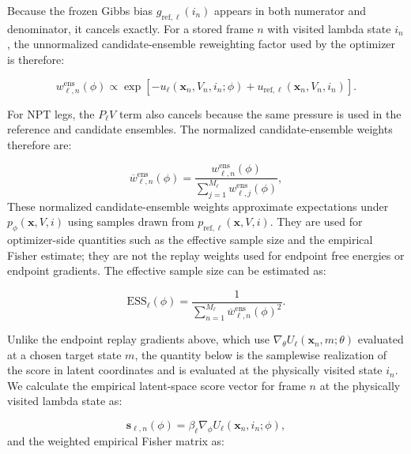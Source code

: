 Because the frozen Gibbs bias $g_{\mathrm{ref},\ell}(i_n)$ appears in both numerator and denominator, it cancels exactly. For a stored frame $n$ with visited lambda state $i_n$, the unnormalized candidate-ensemble reweighting factor used by the optimizer is therefore:

\begin{equation}
    w^{\mathrm{ens}}_{\ell,n}(\phi)
    \propto
    \exp \left[
        -
        u_\ell(\mathbf{x}_n, V_n, i_n; \phi)
        +
        u_{\mathrm{ref},\ell}(\mathbf{x}_n, V_n, i_n)
    \right].
    \label{eq:wactive}
\end{equation}

For NPT legs, the $P_\ell V$ term also cancels because the same pressure is used in the reference and candidate ensembles. The normalized candidate-ensemble weights therefore are:

\begin{equation}
    \overline{w}^{\mathrm{ens}}_{\ell,n}(\phi)
    =
    \frac{
        w^{\mathrm{ens}}_{\ell,n}(\phi)
    }{
        \sum_{j=1}^{M_\ell} w^{\mathrm{ens}}_{\ell,j}(\phi)
    },
    \label{eq:wnorm}
\end{equation}
%
These normalized candidate-ensemble weights approximate expectations under $p_\phi(\mathbf{x}, V, i)$ using samples drawn from $p_{\mathrm{ref},\ell}(\mathbf{x}, V, i)$. They are used for optimizer-side quantities such as the effective sample size and the empirical Fisher estimate; they are not the replay weights used for endpoint free energies or endpoint gradients. The effective sample size can be estimated as:

\begin{equation}
    \mathrm{ESS}_\ell(\phi)
    =
    \frac{1}{
        \sum_{n=1}^{M_\ell}
        \overline{w}^{\mathrm{ens}}_{\ell,n}(\phi)^2
    }.
    \label{eq:ess}
\end{equation}

Unlike the endpoint replay gradients above, which use $\nabla_\theta U_\ell(\mathbf{x}_n, m; \theta)$ evaluated at a chosen target state $m$, the quantity below is the samplewise realization of the score in latent coordinates and is evaluated at the physically visited state $i_n$. We calculate the empirical latent-space score vector for frame $n$ at the physically visited lambda state as:

\begin{equation}
    \mathbf{s}_{\ell,n}(\phi)
    =
    \beta_\ell
    \nabla_\phi
    U_\ell(\mathbf{x}_n, i_n; \phi),
    \label{eq:scoreemp}
\end{equation}
%
and the weighted empirical Fisher matrix as:

